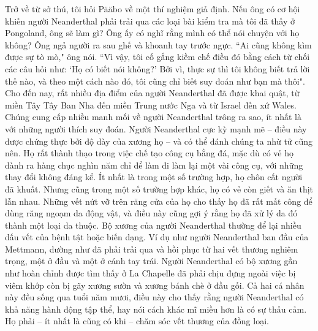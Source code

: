\begin{multicols}{2}
	Trở về từ sở thú, tôi hỏi Pääbo về một thí nghiệm giả định. Nếu ông có cơ hội khiến người Neanderthal phải trải qua các loại bài kiểm tra mà tôi đã thấy ở Pongoland, ông sẽ làm gì? Ông ấy có nghĩ rằng mình có thể nói chuyện với họ không? Ông ngả người ra sau ghế và khoanh tay trước ngực.
	\vskip 0.1cm
	``Ai cũng không kìm được sự tò mò," ông nói. ``Vì vậy, tôi cố gắng kiềm chế điều đó bằng cách từ chối các câu hỏi như: `Họ có biết nói không?' Bởi vì, thực sự thì tôi không biết trả lời thế nào, và theo một cách nào đó, tôi cũng chỉ biết suy đoán như bạn mà thôi".
	\vskip 0.1cm
	Cho đến nay, rất nhiều địa điểm của người Neanderthal đã được khai quật, từ miền Tây Tây Ban Nha đến miền Trung nước Nga và từ Israel đến xứ Wales. Chúng cung cấp nhiều manh mối về người Neanderthal trông ra sao, ít nhất là với những người thích suy đoán. Người Neanderthal cực kỳ mạnh mẽ -- điều này được chứng thực bởi độ dày của xương họ -- và có thể đánh chúng ta nhừ tử cũng nên. Họ rất thành thạo trong việc chế tạo công cụ bằng đá, mặc dù có vẻ họ dành ra hàng chục nghìn năm chỉ để làm đi làm lại một vài công cụ, với những thay đổi không đáng kể. Ít nhất là trong một số trường hợp, họ chôn cất người đã khuất. Nhưng cũng trong một số trường hợp khác, họ có vẻ còn giết và ăn thịt lẫn nhau. Những vết nứt vỡ trên răng cửa của họ cho thấy họ đã rất mất công để dùng răng ngoạm da động vật, và điều này cũng gợi ý rằng họ đã xử lý da đó thành một loại da thuộc. Bộ xương của người Neanderthal thường để lại nhiều dấu vết của bệnh tật hoặc biến dạng. Ví dụ như người Neanderthal ban đầu của Mettmann, dường như đã phải trải qua và hồi phục từ hai vết thương nghiêm trọng, một ở đầu và một ở cánh tay trái. Người Neanderthal có bộ xương gần như hoàn chỉnh được tìm thấy ở La Chapelle đã phải chịu đựng ngoài việc bị viêm khớp còn bị gãy xương sườn và xương bánh chè ở đầu gối. Cả hai cá nhân này đều sống qua tuổi năm mươi, điều này cho thấy rằng người Neanderthal có khả năng hành động tập thể, hay nói cách khác mĩ miều hơn là có sự thấu cảm. Họ phải -- ít nhất là cũng có khi -- chăm sóc vết thương của đồng loại.
	\vskip 0.1cm

\end{multicols}

